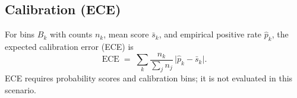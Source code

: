 \subsection{Calibration (ECE)}
For bins $B_k$ with counts $n_k$, mean score $\bar s_k$, and empirical positive rate $\hat p_k$, the expected calibration error (ECE) is
\begin{equation}
\mathrm{ECE} \;=\; \sum_k \frac{n_k}{\sum_j n_j} \,\lvert \hat p_k - \bar s_k\rvert.
\label{eq:ece}
\end{equation}
ECE requires probability scores and calibration bins; it is not evaluated in this scenario.
